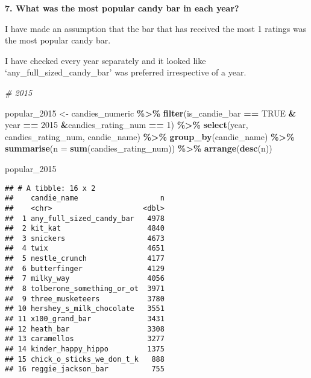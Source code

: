 \documentclass[
]{article}
\newenvironment{Shaded}{\begin{snugshade}}{\end{snugshade}}
\newcommand{\AttributeTok}[1]{\textcolor[rgb]{0.13,0.29,0.53}{#1}}
\newcommand{\CommentTok}[1]{\textcolor[rgb]{0.56,0.35,0.01}{\textit{#1}}}
\newcommand{\ConstantTok}[1]{\textcolor[rgb]{0.56,0.35,0.01}{#1}}
\newcommand{\DecValTok}[1]{\textcolor[rgb]{0.00,0.00,0.81}{#1}}
\newcommand{\FunctionTok}[1]{\textcolor[rgb]{0.13,0.29,0.53}{\textbf{#1}}}
\newcommand{\NormalTok}[1]{#1}
\newcommand{\OtherTok}[1]{\textcolor[rgb]{0.56,0.35,0.01}{#1}}
\newcommand{\SpecialCharTok}[1]{\textcolor[rgb]{0.81,0.36,0.00}{\textbf{#1}}}
\begin{document}
\textbf{7. What was the most popular candy bar in each year?}

I have made an assumption that the bar that has received the most 1
ratings was the most popular candy bar.

I have checked every year separately and it looked like
`any\_full\_sized\_candy\_bar' was preferred irrespective of a year.

\begin{Shaded}
\begin{Highlighting}[]
\CommentTok{\# 2015}

\NormalTok{popular\_2015 }\OtherTok{\textless{}{-}}\NormalTok{ candies\_numeric }\SpecialCharTok{\%\textgreater{}\%} 
  \FunctionTok{filter}\NormalTok{(is\_candie\_bar }\SpecialCharTok{==} \ConstantTok{TRUE} \SpecialCharTok{\&}\NormalTok{ year }\SpecialCharTok{==} \DecValTok{2015} \SpecialCharTok{\&}\NormalTok{candies\_rating\_num }\SpecialCharTok{==} \DecValTok{1}\NormalTok{) }\SpecialCharTok{\%\textgreater{}\%}
  \FunctionTok{select}\NormalTok{(year, candies\_rating\_num, candie\_name) }\SpecialCharTok{\%\textgreater{}\%}
  \FunctionTok{group\_by}\NormalTok{(candie\_name) }\SpecialCharTok{\%\textgreater{}\%} 
  \FunctionTok{summarise}\NormalTok{(}\AttributeTok{n =} \FunctionTok{sum}\NormalTok{(candies\_rating\_num)) }\SpecialCharTok{\%\textgreater{}\%} 
  \FunctionTok{arrange}\NormalTok{(}\FunctionTok{desc}\NormalTok{(n))}

\NormalTok{popular\_2015}
\end{Highlighting}
\end{Shaded}

\begin{verbatim}
## # A tibble: 16 x 2
##    candie_name                   n
##    <chr>                     <dbl>
##  1 any_full_sized_candy_bar   4978
##  2 kit_kat                    4840
##  3 snickers                   4673
##  4 twix                       4651
##  5 nestle_crunch              4177
##  6 butterfinger               4129
##  7 milky_way                  4056
##  8 tolberone_something_or_ot  3971
##  9 three_musketeers           3780
## 10 hershey_s_milk_chocolate   3551
## 11 x100_grand_bar             3431
## 12 heath_bar                  3308
## 13 caramellos                 3277
## 14 kinder_happy_hippo         1375
## 15 chick_o_sticks_we_don_t_k   888
## 16 reggie_jackson_bar          755
\end{verbatim}
\end{document}
